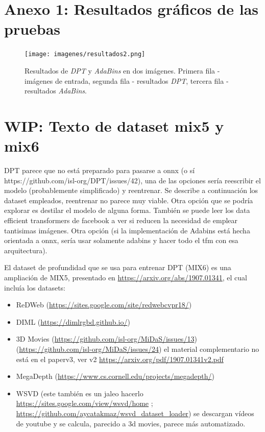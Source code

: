 \documentclass[a4paper, 11pt]{article}
\begin{document}
\section{Anexo 1: Resultados gráficos de las pruebas}\label{anexo1}
\begin{figure}[H]
\centering
\texttt{[image: imagenes/resultados2.png]} 
\captionsetup{width=.8\linewidth}
\caption{Resultados de \textit{DPT} y \textit{AdaBins} en dos imágenes. Primera fila - imágenes de entrada, segunda fila - resultados \textit{DPT}, tercera fila - resultados \textit{AdaBins}.}
\label{fig:resultados-anexo2}
\end{figure}

\section{WIP: Texto de dataset mix5 y mix6}\label{unk}
DPT parece que no está preparado para pasarse a onnx (o sí https://github.com/isl-org/DPT/issues/42), una de las opciones sería reescribir el modelo (probablemente simplificado) y reentrenar. Se describe a continuación los dataset empleados, reentrenar no parece muy viable. Otra opción que se podría explorar es destilar el modelo de alguna forma. También se puede leer los data efficient transformers de facebook a ver si reducen la necesidad de emplear tantisimas imágenes. Otra opción (si la implementación de Adabins está hecha orientada a onnx, sería usar solamente adabins y hacer todo el tfm con esa arquitectura).

El dataset de profundidad que se usa para entrenar DPT (MIX6) es una ampliación de MIX5, presentado en \url{https://arxiv.org/abs/1907.01341}, el cual incluía los datasets:
\begin{itemize}
\item ReDWeb (\url{https://sites.google.com/site/redwebcvpr18/})
\item DIML (\url{https://dimlrgbd.github.io/})
\item 3D Movies (\url{https://github.com/isl-org/MiDaS/issues/13}) (\url{https://github.com/isl-org/MiDaS/issues/24}) el material complementario no está en el paperv3, ver v2 \url{https://arxiv.org/pdf/1907.01341v2.pdf}
\item MegaDepth (\url{https://www.cs.cornell.edu/projects/megadepth/})
\item WSVD (este también es un jaleo hacerlo \url{https://sites.google.com/view/wsvd/home} ; \url{https://github.com/aycatakmaz/wsvd_dataset_loader}) se descargan vídeos de youtube y se calcula, parecido a 3d movies, parece más automatizado.
\end{itemize}
\end{document}

